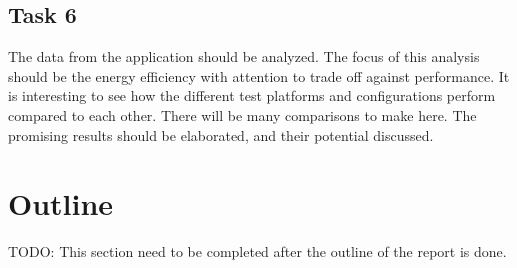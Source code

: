 \subsection{Task 6}
The data from the application should be analyzed.
The focus of this analysis should be the energy efficiency with attention to trade off against performance.
It is interesting to see how the different test platforms and configurations perform compared to each other.
There will be many comparisons to make here.
The promising results should be elaborated, and their potential discussed.

\section{Outline}
TODO: This section need to be completed after the outline of the report is done.
